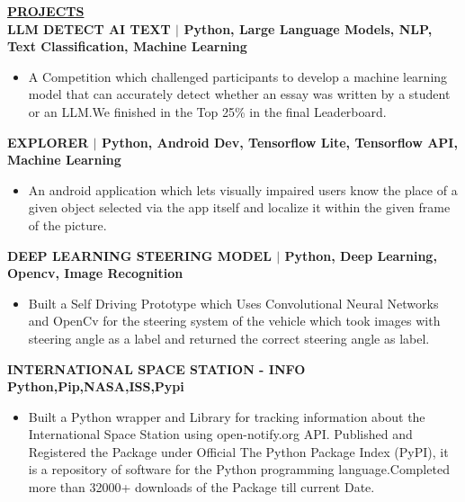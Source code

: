\documentclass{article}
\begin{document}
\noindent \textbf{\underline{PROJECTS}} \\
\textbf{\textbf{LLM DETECT AI TEXT } $\mid$ Python, Large Language Models, NLP, Text Classification, Machine Learning} 
\begin{itemize}[noitemsep,nolistsep,leftmargin=*]
    \item A Competition which challenged participants to develop a machine learning model that can accurately detect whether
an essay was written by a student or an LLM.We finished in the Top 25\% in the final Leaderboard.


\end{itemize}
\textbf{\textbf{EXPLORER}  $\mid$ {Python, Android Dev, Tensorflow Lite, Tensorflow API, Machine Learning} }
\begin{itemize}[noitemsep,nolistsep,leftmargin=*]
    \item An android application which lets visually impaired users know the place of a given object selected via the app itself and
localize it within the given frame of the picture.

\end{itemize}
\textbf{\textbf{DEEP LEARNING STEERING MODEL} $\mid$  {Python, Deep Learning, Opencv, Image Recognition} } 
\begin{itemize}[noitemsep,nolistsep,leftmargin=*]
    \item Built a Self Driving Prototype which Uses Convolutional Neural Networks and OpenCv for the steering system of the
vehicle which took images with steering angle as a label and returned the correct steering angle as label.

\end{itemize}
\textbf{\textbf{INTERNATIONAL SPACE STATION - INFO }  {Python,Pip,NASA,ISS,Pypi}} 
\begin{itemize}[noitemsep,nolistsep,leftmargin=*]
    \item Built a Python wrapper and Library for tracking information about the International Space Station using open-notify.org API.
Published and Registered the Package under Official The Python Package Index (PyPI), it is a repository of software for the
Python programming language.Completed more than 32000+ downloads of the Package till current Date.
\end{itemize}
\end{document}
